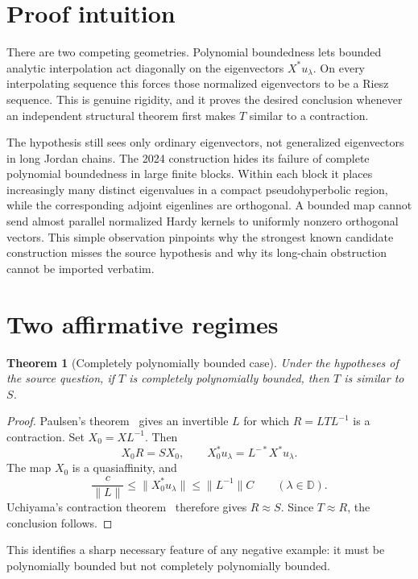 \documentclass[11pt]{article}
\newtheorem{theorem}{Theorem}
\newcommand{\D}{\mathbb D}
\begin{document}
\section{Proof intuition}

There are two competing geometries.  Polynomial boundedness lets bounded
analytic interpolation act diagonally on the eigenvectors $X^*u_\lambda$.
On every interpolating sequence this forces those normalized eigenvectors to
be a Riesz sequence.  This is genuine rigidity, and it proves the desired
conclusion whenever an independent structural theorem first makes $T$
similar to a contraction.

The hypothesis still sees only ordinary eigenvectors, not generalized
eigenvectors in long Jordan chains.  The 2024 construction hides its failure
of complete polynomial boundedness in large finite blocks.  Within each
block it places increasingly many distinct eigenvalues in a compact
pseudohyperbolic region, while the corresponding adjoint eigenlines are
orthogonal.  A bounded map cannot send almost parallel normalized Hardy
kernels to uniformly nonzero orthogonal vectors.  This simple observation
pinpoints why the strongest known candidate construction misses the source
hypothesis and why its long-chain obstruction cannot be imported verbatim.

\section{Two affirmative regimes}

\begin{theorem}[Completely polynomially bounded case]\label{thm:cpb}
Under the hypotheses of the source question, if $T$ is completely
polynomially bounded, then $T$ is similar to $S$.
\end{theorem}

\begin{proof}
Paulsen's theorem~\cite{Paulsen} gives an invertible $L$ for which
$R=LTL^{-1}$ is a contraction.  Set $X_0=XL^{-1}$.  Then
\[
 X_0R=SX_0,
 \qquad X_0^*u_\lambda=L^{-*}X^*u_\lambda.
\]
The map $X_0$ is a quasiaffinity, and
\[
 \frac{c}{\|L\|}\leq\|X_0^*u_\lambda\|
 \leq \|L^{-1}\|C \qquad(\lambda\in\D).
\]
Uchiyama's contraction theorem~\cite{Uchiyama} therefore gives $R\approx S$.
Since $T\approx R$, the conclusion follows.
\end{proof}

This identifies a sharp necessary feature of any negative example: it must
be polynomially bounded but not completely polynomially bounded.
\end{document}
